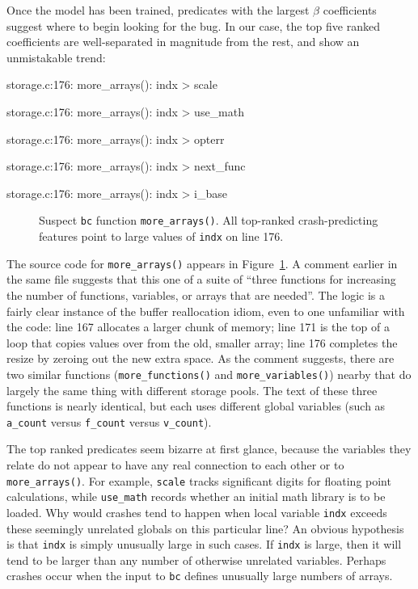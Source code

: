 Once the model has been trained, predicates with the largest $\beta$
coefficients suggest where to begin looking for the bug.  In our case,
the top five ranked coefficients are well-separated in magnitude from
the rest, and show an unmistakable trend:

\begin{features}
\item storage.c:176: more\_arrays(): indx > scale
\item storage.c:176: more\_arrays(): indx > use\_math
\item storage.c:176: more\_arrays(): indx > opterr
\item storage.c:176: more\_arrays(): indx > next\_func
\item storage.c:176: more\_arrays(): indx > i\_base
\end{features}

\begin{figure}
  \centering
  \caption{Suspect \texttt{bc} function \texttt{more\_arrays()}.  All
  top-ranked crash-predicting features point to large values of
  \texttt{indx} on line 176.}
  \label{fig:bc:more-arrays}
\end{figure}

The source code for \texttt{more\_arrays()} appears in
Figure~\ref{fig:bc:more-arrays}.  A comment earlier in the same file
suggests that this one of a suite of ``three functions for increasing
the number of functions, variables, or arrays that are needed''.  The
logic is a fairly clear instance of the buffer reallocation idiom,
even to one unfamiliar with the code: line 167 allocates a larger
chunk of memory; line 171 is the top of a loop that copies values over
from the old, smaller array; line 176 completes the resize by zeroing
out the new extra space.  As the comment suggests, there are two
similar functions (\texttt{more\_functions()} and
\texttt{more\_variables()}) nearby that do largely the same thing with
different storage pools.  The text of these three functions is nearly
identical, but each uses different global variables (such as
\texttt{a\_count} versus \texttt{f\_count} versus \texttt{v\_count}).

The top ranked predicates seem bizarre at first glance, because the
variables they relate do not appear to have any real connection to
each other or to \texttt{more\_arrays()}.  For example, \texttt{scale}
tracks significant digits for floating point calculations, while
\texttt{use\_math} records whether an initial math library is to be
loaded.  Why would crashes tend to happen when local variable
\texttt{indx} exceeds these seemingly unrelated globals on this
particular line?  An obvious hypothesis is that \texttt{indx} is
simply unusually large in such cases.  If \texttt{indx} is large, then
it will tend to be larger than any number of otherwise unrelated
variables.  Perhaps crashes occur when the input to \texttt{bc}
defines unusually large numbers of arrays.

